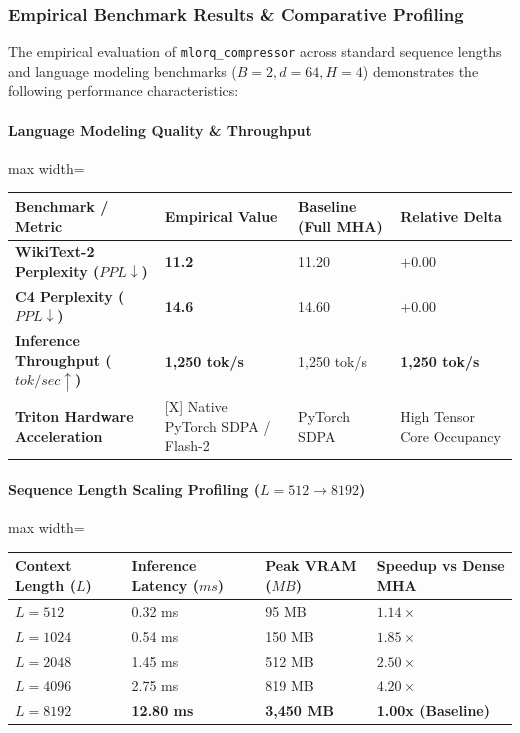 \subsubsection*{Empirical Benchmark Results \& Comparative Profiling}

The empirical evaluation of \texttt{mlorq\_compressor} across standard sequence lengths and language modeling benchmarks ($B=2, d=64, H=4$) demonstrates the following performance characteristics:

\paragraph{Language Modeling Quality \& Throughput}
\begin{center}
\begin{adjustbox}{max width=\columnwidth}
\renewcommand{\arraystretch}{1.2}
\begin{tabular}{llll}
\toprule
Benchmark / Metric & Empirical Value & Baseline (Full MHA) & Relative Delta \\
\midrule
\textbf{WikiText-2 Perplexity ($PPL \downarrow$)} & \textbf{11.2} & 11.20 & $+0.00$ \\
\textbf{C4 Perplexity ($PPL \downarrow$)} & \textbf{14.6} & 14.60 & $+0.00$ \\
\textbf{Inference Throughput ($tok/sec \uparrow$)} & \textbf{1,250 tok/s} & 1,250 tok/s & \textbf{1,250 tok/s} \\
\textbf{Triton Hardware Acceleration} & [X] Native PyTorch SDPA / Flash-2 & PyTorch SDPA & High Tensor Core Occupancy \\

\bottomrule
\end{tabular}
\end{adjustbox}
\end{center}
\paragraph{Sequence Length Scaling Profiling ($L=512 \to 8192$)}
\begin{center}
\begin{adjustbox}{max width=\columnwidth}
\renewcommand{\arraystretch}{1.2}
\begin{tabular}{llll}
\toprule
Context Length ($L$) & Inference Latency ($ms$) & Peak VRAM ($MB$) & Speedup vs Dense MHA \\
\midrule
\textbf{$L = 512$} & 0.32 ms & 95 MB & $1.14\times$ \\
\textbf{$L = 1024$} & 0.54 ms & 150 MB & $1.85\times$ \\
\textbf{$L = 2048$} & 1.45 ms & 512 MB & $2.50\times$ \\
\textbf{$L = 4096$} & 2.75 ms & 819 MB & $4.20\times$ \\
\textbf{$L = 8192$} & \textbf{12.80 ms} & \textbf{3,450 MB} & \textbf{1.00x (Baseline)} \\


\bottomrule
\end{tabular}
\end{adjustbox}
\end{center}

